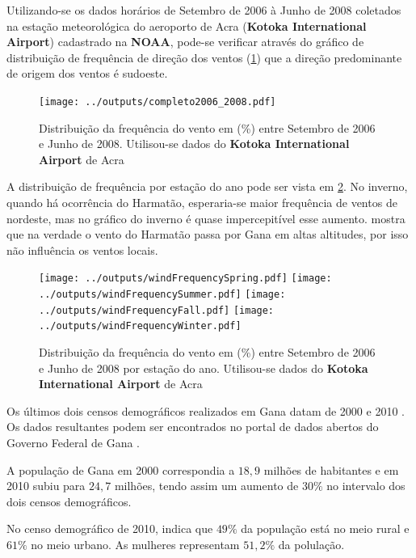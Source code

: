 Utilizando-se os dados horários de Setembro de 2006 à Junho de 2008 
coletados na estação meteorológica do aeroporto de Acra 
(\textbf{Kotoka International Airport}) cadastrado na \textbf{NOAA},
pode-se verificar através do gráfico de distribuição de frequência de
direção dos ventos (\ref{fg:windFrequencyCompleto}) que a direção 
predominante de origem dos ventos é sudoeste.
 
\begin{figure}[H]
  \centering
  \texttt{[image: ../outputs/completo2006\_2008.pdf]}
  \caption{Distribuição da frequência do vento em (\%) entre
           Setembro de 2006 e Junho de 2008. Utilisou-se dados 
           do \textbf{Kotoka International Airport} de Acra \label{fg:windFrequencyCompleto}}
\end{figure}

A distribuição de frequência por estação do ano pode ser vista em 
\ref{fg:windFrequencyStation}. 
No inverno, quando há ocorrência do Harmatão, esperaria-se maior
frequência de ventos de nordeste, mas no gráfico do inverno é quase 
impercepitível esse aumento. \citep{breuning2005} mostra que na 
verdade o vento do Harmatão passa por Gana em altas altitudes, por isso
não influência os ventos locais. 

\begin{figure}[H]
  \centering
  \texttt{[image: ../outputs/windFrequencySpring.pdf]}
  \texttt{[image: ../outputs/windFrequencySummer.pdf]}
  \texttt{[image: ../outputs/windFrequencyFall.pdf]}
  \texttt{[image: ../outputs/windFrequencyWinter.pdf]}
  \caption{Distribuição da frequência do vento em (\%) entre
           Setembro de 2006 e Junho de 2008 por estação do ano. Utilisou-se dados 
           do \textbf{Kotoka International Airport} de Acra \label{fg:windFrequencyStation}}
\end{figure}

Os últimos dois censos demográficos realizados em Gana datam
de 2000 \citep{ghanacensus2003} e 2010 \citep{ghanacensus2013}. Os
dados resultantes podem ser encontrados no portal de dados abertos
do Governo Federal de Gana \citep{opendataghana}.

A população de Gana em 2000 correspondia a $18,9$ milhões 
de habitantes e em 2010 subiu para $24,7$ milhões, tendo assim
um aumento de $30\%$ no intervalo dos dois censos demográficos.

No censo demográfico de 2010, indica que $49\%$ da população está 
no meio rural e $61\%$ no meio urbano. As mulheres representam 
$51,2\%$ da polulação.

